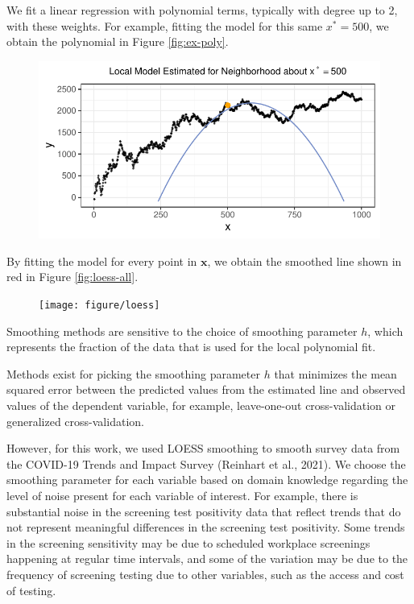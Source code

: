 \documentclass[12pt,twoside]{smiththesis}
\begin{document}
We fit a linear regression with polynomial terms, typically with degree up to 2, with these weights. For example, fitting the model for this same \(x^*=500\), we obtain the polynomial in Figure \ref{fig:ex-poly}.
\begin{flushleft}
\begin{figure}

{\centering \includegraphics[width=1\linewidth]{thesis_files/figure-latex/unnamed-chunk-34-1} 

}

\caption{\label{fig:ex-poly}}\label{fig:unnamed-chunk-34}
\end{figure}
\end{flushleft}
By fitting the model for every point in \(\mathbf x\), we obtain the smoothed line shown in red in Figure \ref{fig:loess-all}.
\begin{figure}

{\centering \texttt{[image: figure/loess]} 

}

\caption{\label{fig:loess-all}}\label{fig:unnamed-chunk-36}
\end{figure}
Smoothing methods are sensitive to the choice of smoothing parameter \(h\), which represents the fraction of the data that is used for the local polynomial fit.

Methods exist for picking the smoothing parameter \(h\) that minimizes the mean squared error between the predicted values from the estimated line and observed values of the dependent variable, for example, leave-one-out cross-validation or generalized cross-validation.

However, for this work, we used LOESS smoothing to smooth survey data from the COVID-19 Trends and Impact Survey (Reinhart et al., 2021).
We choose the smoothing parameter for each variable based on domain knowledge regarding the level of noise present for each variable of interest. For example, there is substantial noise in the screening test positivity data that reflect trends that do not represent meaningful differences in the screening test positivity. Some trends in the screening sensitivity may be due to scheduled workplace screenings happening at regular time intervals, and some of the variation may be due to the frequency of screening testing due to other variables, such as the access and cost of testing.
\end{document}
